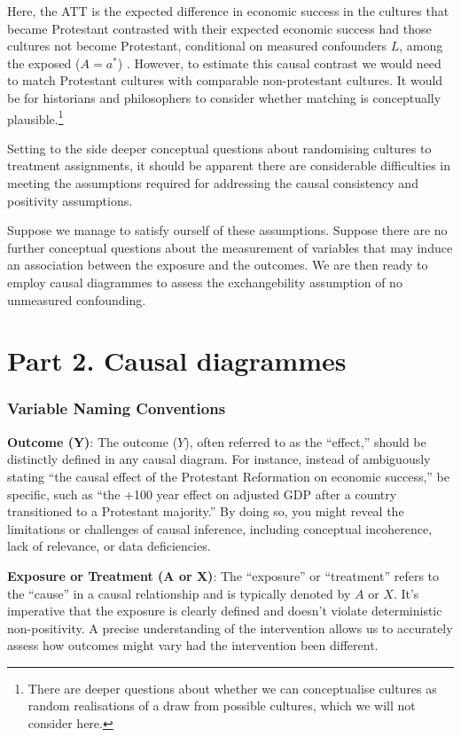 \documentclass[
  singlecolumn]{report}
\begin{document}
Here, the ATT is the expected difference in economic success in the
cultures that became Protestant contrasted with their expected economic
success had those cultures not become Protestant, conditional on
measured confounders \(L\), among the exposed (\(A = a^*\)) . However,
to estimate this causal contrast we would need to match Protestant
cultures with comparable non-protestant cultures. It would be for
historians and philosophers to consider whether matching is conceptually
plausible.\footnote{There are deeper questions about whether we can
  conceptualise cultures as random realisations of a draw from possible
  cultures, which we will not consider here.}

Setting to the side deeper conceptual questions about randomising
cultures to treatment assignments, it should be apparent there are
considerable difficulties in meeting the assumptions required for
addressing the causal consistency and positivity assumptions.

Suppose we manage to satisfy ourself of these assumptions. Suppose there
are no further conceptual questions about the measurement of variables
that may induce an association between the exposure and the outcomes. We
are then ready to employ causal diagrammes to assess the exchangebility
assumption of no unmeasured confounding.

\hypertarget{part-2.-causal-diagrammes}{%
\section{Part 2. Causal diagrammes}\label{part-2.-causal-diagrammes}}

\hypertarget{variable-naming-conventions}{%
\subsubsection{Variable Naming
Conventions}\label{variable-naming-conventions}}

\textbf{Outcome (Y)}: The outcome (\(Y\)), often referred to as the
``effect,'' should be distinctly defined in any causal diagram. For
instance, instead of ambiguously stating ``the causal effect of the
Protestant Reformation on economic success,'' be specific, such as ``the
+100 year effect on adjusted GDP after a country transitioned to a
Protestant majority.'' By doing so, you might reveal the limitations or
challenges of causal inference, including conceptual incoherence, lack
of relevance, or data deficiencies.

\textbf{Exposure or Treatment (A or X)}: The ``exposure'' or
``treatment'' refers to the ``cause'' in a causal relationship and is
typically denoted by \(A\) or \(X\). It's imperative that the exposure
is clearly defined and doesn't violate deterministic non-positivity. A
precise understanding of the intervention allows us to accurately assess
how outcomes might vary had the intervention been different.
\end{document}

